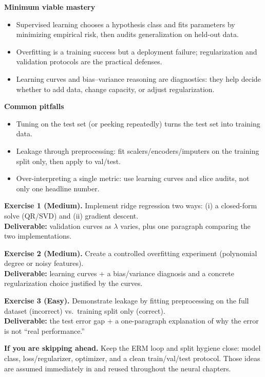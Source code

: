\begin{tcolorbox}[summarybox, title={Key takeaways}]
\textbf{Minimum viable mastery}
\begin{itemize}
    \item Supervised learning chooses a hypothesis class and fits parameters by minimizing empirical risk, then audits generalization on held-out data.
    \item Overfitting is a training success but a deployment failure; regularization and validation protocols are the practical defenses.
    \item Learning curves and bias--variance reasoning are diagnostics: they help decide whether to add data, change capacity, or adjust regularization.
\end{itemize}
\medskip
\textbf{Common pitfalls}
\begin{itemize}
    \item Tuning on the test set (or peeking repeatedly) turns the test set into training data.
    \item Leakage through preprocessing: fit scalers/encoders/imputers on the training split only, then apply to val/test.
    \item Over-interpreting a single metric: use learning curves and slice audits, not only one headline number.
\end{itemize}
\end{tcolorbox}

\begin{tcolorbox}[summarybox, title={Exercises}]
\textbf{Exercise 1 (Medium).} Implement ridge regression two ways: (i) a closed-form solve (QR/SVD) and (ii) gradient descent. \\
\textbf{Deliverable:} validation curves as \(\lambda\) varies, plus one paragraph comparing the two implementations.

\smallskip
\textbf{Exercise 2 (Medium).} Create a controlled overfitting experiment (polynomial degree or noisy features). \\
\textbf{Deliverable:} learning curves + a bias/variance diagnosis and a concrete regularization choice justified by the curves.

\smallskip
\textbf{Exercise 3 (Easy).} Demonstrate leakage by fitting preprocessing on the full dataset (incorrect) vs.\ training split only (correct). \\
\textbf{Deliverable:} the test error gap + a one-paragraph explanation of why the error is not ``real performance.''

\par\medskip
\noindent\textbf{If you are skipping ahead.} Keep the ERM loop and split hygiene close: model class, loss/regularizer, optimizer, and a clean train/val/test protocol. Those ideas are assumed immediately in  and reused throughout the neural chapters.
\end{tcolorbox}

